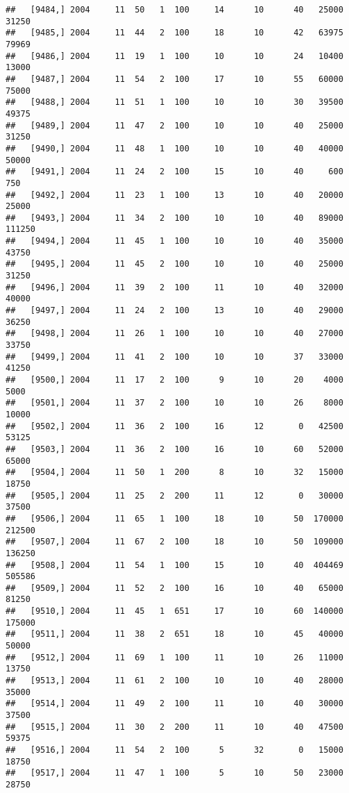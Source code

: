 \documentclass{article}\usepackage[]{graphicx}\usepackage[]{color}
\makeatletter
\newenvironment{kframe}{%
 \def\at@end@of@kframe{}%
 \ifinner\ifhmode%
  \def\at@end@of@kframe{\end{minipage}}%
  \begin{minipage}{\columnwidth}%
 \fi\fi%
 \def\FrameCommand##1{\hskip\@totalleftmargin \hskip-\fboxsep
 \colorbox{shadecolor}{##1}\hskip-\fboxsep
     \hskip-\linewidth \hskip-\@totalleftmargin \hskip\columnwidth}%
 \MakeFramed {\advance\hsize-\width
   \@totalleftmargin\z@ \linewidth\hsize
   \@setminipage}}%
 {\par\unskip\endMakeFramed%
 \at@end@of@kframe}
\newenvironment{knitrout}{}{} %
\makeatother
\begin{document}
\begin{knitrout}
\begin{kframe}
\begin{verbatim}
##   [9484,] 2004     11  50   1  100     14      10      40   25000   31250
##   [9485,] 2004     11  44   2  100     18      10      42   63975   79969
##   [9486,] 2004     11  19   1  100     10      10      24   10400   13000
##   [9487,] 2004     11  54   2  100     17      10      55   60000   75000
##   [9488,] 2004     11  51   1  100     10      10      30   39500   49375
##   [9489,] 2004     11  47   2  100     10      10      40   25000   31250
##   [9490,] 2004     11  48   1  100     10      10      40   40000   50000
##   [9491,] 2004     11  24   2  100     15      10      40     600     750
##   [9492,] 2004     11  23   1  100     13      10      40   20000   25000
##   [9493,] 2004     11  34   2  100     10      10      40   89000  111250
##   [9494,] 2004     11  45   1  100     10      10      40   35000   43750
##   [9495,] 2004     11  45   2  100     10      10      40   25000   31250
##   [9496,] 2004     11  39   2  100     11      10      40   32000   40000
##   [9497,] 2004     11  24   2  100     13      10      40   29000   36250
##   [9498,] 2004     11  26   1  100     10      10      40   27000   33750
##   [9499,] 2004     11  41   2  100     10      10      37   33000   41250
##   [9500,] 2004     11  17   2  100      9      10      20    4000    5000
##   [9501,] 2004     11  37   2  100     10      10      26    8000   10000
##   [9502,] 2004     11  36   2  100     16      12       0   42500   53125
##   [9503,] 2004     11  36   2  100     16      10      60   52000   65000
##   [9504,] 2004     11  50   1  200      8      10      32   15000   18750
##   [9505,] 2004     11  25   2  200     11      12       0   30000   37500
##   [9506,] 2004     11  65   1  100     18      10      50  170000  212500
##   [9507,] 2004     11  67   2  100     18      10      50  109000  136250
##   [9508,] 2004     11  54   1  100     15      10      40  404469  505586
##   [9509,] 2004     11  52   2  100     16      10      40   65000   81250
##   [9510,] 2004     11  45   1  651     17      10      60  140000  175000
##   [9511,] 2004     11  38   2  651     18      10      45   40000   50000
##   [9512,] 2004     11  69   1  100     11      10      26   11000   13750
##   [9513,] 2004     11  61   2  100     10      10      40   28000   35000
##   [9514,] 2004     11  49   2  100     11      10      40   30000   37500
##   [9515,] 2004     11  30   2  200     11      10      40   47500   59375
##   [9516,] 2004     11  54   2  100      5      32       0   15000   18750
##   [9517,] 2004     11  47   1  100      5      10      50   23000   28750

\end{verbatim}
\end{kframe}
\end{knitrout}
\end{document}
